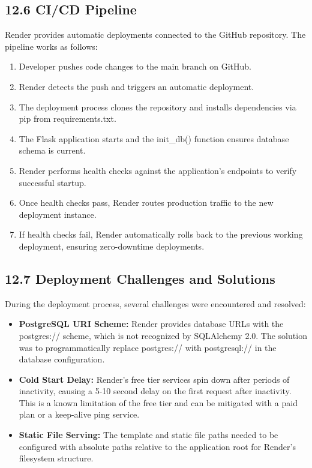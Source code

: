 ﻿\documentclass[12pt]{article}
\begin{document}
\subsection*{12.6 CI/CD Pipeline}
Render provides automatic deployments connected to the GitHub repository. The pipeline works as follows:
\begin{enumerate}
\item Developer pushes code changes to the main branch on GitHub.
\item Render detects the push and triggers an automatic deployment.
\item The deployment process clones the repository and installs dependencies via pip from requirements.txt.
\item The Flask application starts and the init\_db() function ensures database schema is current.
\item Render performs health checks against the application's endpoints to verify successful startup.
\item Once health checks pass, Render routes production traffic to the new deployment instance.
\item If health checks fail, Render automatically rolls back to the previous working deployment, ensuring zero-downtime deployments.
\end{enumerate}

\subsection*{12.7 Deployment Challenges and Solutions}
During the deployment process, several challenges were encountered and resolved:
\begin{itemize}
\item \textbf{PostgreSQL URI Scheme:} Render provides database URLs with the postgres:// scheme, which is not recognized by SQLAlchemy 2.0. The solution was to programmatically replace postgres:// with postgresql:// in the database configuration.
\item \textbf{Cold Start Delay:} Render's free tier services spin down after periods of inactivity, causing a 5-10 second delay on the first request after inactivity. This is a known limitation of the free tier and can be mitigated with a paid plan or a keep-alive ping service.
\item \textbf{Static File Serving:} The template and static file paths needed to be configured with absolute paths relative to the application root for Render's filesystem structure.
\end{itemize}
\newpage
\end{document}
